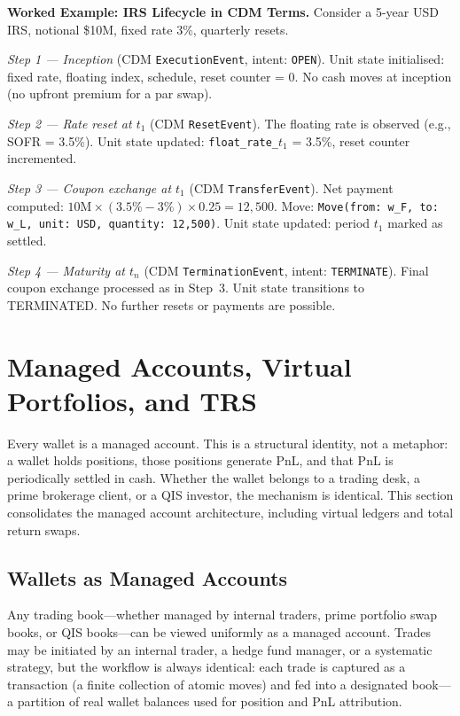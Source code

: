 \documentclass[11pt,a4paper]{article}
\begin{document}
\medskip

\noindent\textbf{Worked Example: IRS Lifecycle in CDM Terms.}
Consider a 5-year USD IRS, notional \$10M, fixed rate 3\%, quarterly resets.

\noindent\textit{Step 1 --- Inception} (CDM \texttt{ExecutionEvent}, intent: \texttt{OPEN}). Unit state initialised: fixed rate, floating index, schedule, reset counter = 0. No cash moves at inception (no upfront premium for a par swap).

\noindent\textit{Step 2 --- Rate reset at $t_1$} (CDM \texttt{ResetEvent}). The floating rate is observed (e.g., SOFR = 3.5\%). Unit state updated: \texttt{float\_rate\_$t_1$} = 3.5\%, reset counter incremented.

\noindent\textit{Step 3 --- Coupon exchange at $t_1$} (CDM \texttt{TransferEvent}). Net payment computed: $10\text{M} \times (3.5\% - 3\%) \times 0.25 = 12{,}500$. Move: \texttt{Move(from: w\_F, to: w\_L, unit: USD, quantity: 12,500)}. Unit state updated: period $t_1$ marked as settled.

\noindent\textit{Step 4 --- Maturity at $t_n$} (CDM \texttt{TerminationEvent}, intent: \texttt{TERMINATE}). Final coupon exchange processed as in Step~3. Unit state transitions to TERMINATED. No further resets or payments are possible.

\clearpage
\section{Managed Accounts, Virtual Portfolios, and TRS}
\label{sec:managed}

Every wallet is a managed account. This is a structural identity, not a metaphor: a wallet holds positions, those positions generate PnL, and that PnL is periodically settled in cash. Whether the wallet belongs to a trading desk, a prime brokerage client, or a QIS investor, the mechanism is identical. This section consolidates the managed account architecture, including virtual ledgers and total return swaps.

\subsection{Wallets as Managed Accounts}

Any trading book---whether managed by internal traders, prime portfolio swap books, or QIS books---can be viewed uniformly as a managed account. Trades may be initiated by an internal trader, a hedge fund manager, or a systematic strategy, but the workflow is always identical: each trade is captured as a transaction (a finite collection of atomic moves) and fed into a designated book---a partition of real wallet balances used for position and PnL attribution.
\end{document}
